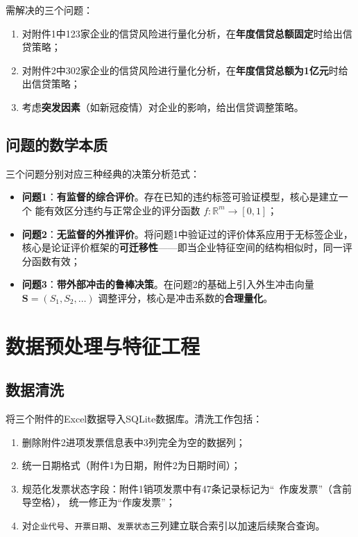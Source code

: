 \documentclass[12pt,a4paper]{ctexart}
\begin{document}
需解决的三个问题：
\begin{enumerate}[label=(\arabic*)]
    \item 对附件1中123家企业的信贷风险进行量化分析，在\textbf{年度信贷总额固定}时给出信贷策略；
    \item 对附件2中302家企业的信贷风险进行量化分析，在\textbf{年度信贷总额为1亿元}时给出信贷策略；
    \item 考虑\textbf{突发因素}（如新冠疫情）对企业的影响，给出信贷调整策略。
\end{enumerate}

\subsection{问题的数学本质}

三个问题分别对应三种经典的决策分析范式：
\begin{itemize}
    \item \textbf{问题1}：\textbf{有监督的综合评价}。存在已知的违约标签可验证模型，核心是建立一个
          能有效区分违约与正常企业的评分函数 $f: \mathbb{R}^m \to [0,1]$；
    \item \textbf{问题2}：\textbf{无监督的外推评价}。将问题1中验证过的评价体系应用于无标签企业，
          核心是论证评价框架的\textbf{可迁移性}——即当企业特征空间的结构相似时，同一评分函数有效；
    \item \textbf{问题3}：\textbf{带外部冲击的鲁棒决策}。在问题2的基础上引入外生冲击向量
          $\mathbf{S} = (S_1, S_2, \ldots)$ 调整评分，核心是冲击系数的\textbf{合理量化}。
\end{itemize}

\section{数据预处理与特征工程}

\subsection{数据清洗}

将三个附件的Excel数据导入SQLite数据库。清洗工作包括：
\begin{enumerate}
    \item 删除附件2进项发票信息表中3列完全为空的数据列；
    \item 统一日期格式（附件1为日期，附件2为日期时间）；
    \item 规范化发票状态字段：附件1销项发票中有47条记录标记为``\ 作废发票''（含前导空格），
          统一修正为``作废发票''；
    \item 对\verb|企业代号|、\verb|开票日期|、\verb|发票状态|三列建立联合索引以加速后续聚合查询。
\end{enumerate}
\end{document}
